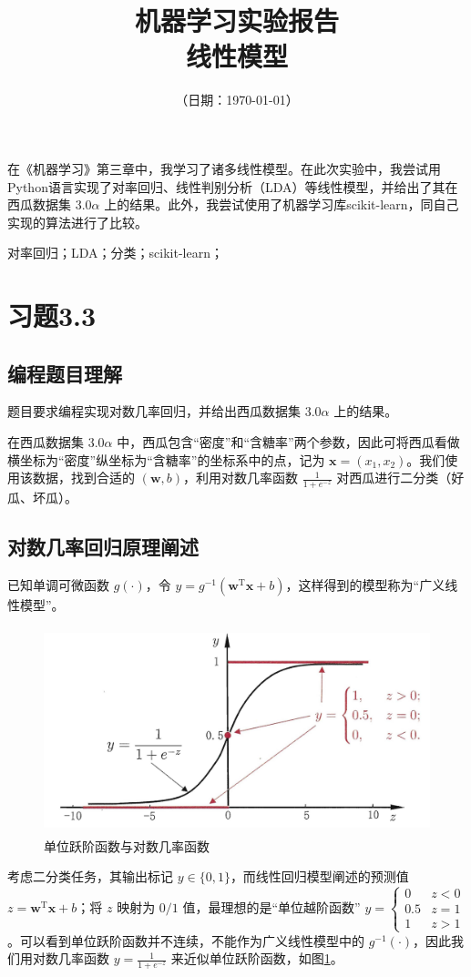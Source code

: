 \documentclass{ctexart}
\title{\textbf{机器学习实验报告\\{\Large{线性模型}}}} %
\author{\sffamily{朱天泽}} %
\date{（日期：\today）} %
\begin{document}
	\maketitle\thispagestyle{fancy}
		在《机器学习》第三章中，我学习了诸多线性模型。在此次实验中，我尝试用Python语言实现了对率回归、线性判别分析（LDA）等线性模型，并给出了其在西瓜数据集 $3.0\alpha$ 上的结果。此外，我尝试使用了机器学习库scikit-learn，同自己实现的算法进行了比较。
		
	 对率回归；LDA；分类；scikit-learn；
	
	\section{习题3.3}
	\subsection{编程题目理解}
	题目要求编程实现对数几率回归，并给出西瓜数据集 $3.0\alpha$ 上的结果。
	
	在西瓜数据集 $3.0\alpha$ 中，西瓜包含“密度”和“含糖率”两个参数，因此可将西瓜看做横坐标为“密度”纵坐标为“含糖率”的坐标系中的点，记为 $\bm{x}=(x_1,x_2)$。我们使用该数据，找到合适的 $(\bm{w},b)$，利用对数几率函数 $\frac{1}{1+e^{-z}}$ 对西瓜进行二分类（好瓜、坏瓜）。
	\subsection{对数几率回归原理阐述}
	已知单调可微函数 $g(\cdot)$，令 $y=g^{-1}(\bm{w}^\mathrm{T}\bm{x}+b)$，这样得到的模型称为“广义线性模型”。
	
	\begin{figure}[htb]
		\centering
		\includegraphics[scale=1,height=6cm]{../image/Logistic.png}
		\caption{单位跃阶函数与对数几率函数}
		\label{Image_Logistic}
	\end{figure}
	
	考虑二分类任务，其输出标记 $y\in\{0,1\}$，而线性回归模型阐述的预测值 $z=\bm{w}^\mathrm{T}\bm{x}+b$；将 $z$ 映射为 $0/1$ 值，最理想的是“单位越阶函数” $y=\begin{cases}0&z<0\\0.5&z=1\\1&z>1\end{cases}$。可以看到单位跃阶函数并不连续，不能作为广义线性模型中的 $g^{-1}(\cdot)$，因此我们用对数几率函数 $y=\frac{1}{1+e^{-z}}$ 来近似单位跃阶函数，如图\ref{Image_Logistic}。
	
\end{document}
